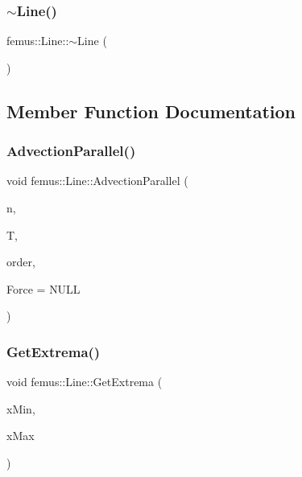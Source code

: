 \mbox{\label{classfemus_1_1_line_a2ee2052aae5a265496dd4a28e3eac459}} 
\subsubsection{\texorpdfstring{$\sim$\+Line()}{~Line()}}
{\footnotesize\ttfamily femus\+::\+Line\+::$\sim$\+Line (\begin{DoxyParamCaption}{ }\end{DoxyParamCaption})}



\subsection{Member Function Documentation}
\mbox{\label{classfemus_1_1_line_a4ee4b75bb07d8849015130c57dfde0d7}} 
\subsubsection{\texorpdfstring{Advection\+Parallel()}{AdvectionParallel()}}
{\footnotesize\ttfamily void femus\+::\+Line\+::\+Advection\+Parallel (\begin{DoxyParamCaption}\item[{const unsigned \&}]{n,  }\item[{const double \&}]{T,  }\item[{const unsigned \&}]{order,  }\item[{\mbox{\hyperlink{classfemus_1_1_line_a34a5fe4198ea2eb339bffeef484ae77e}{Force\+Function}}}]{Force = {\ttfamily NULL} }\end{DoxyParamCaption})}

\mbox{\label{classfemus_1_1_line_aa08f01ce094ab356465008c38a1c0171}} 
\subsubsection{\texorpdfstring{Get\+Extrema()}{GetExtrema()}}
{\footnotesize\ttfamily void femus\+::\+Line\+::\+Get\+Extrema (\begin{DoxyParamCaption}\item[{std\+::vector$<$ double $>$ \&}]{x\+Min,  }\item[{std\+::vector$<$ double $>$ \&}]{x\+Max }\end{DoxyParamCaption})}

